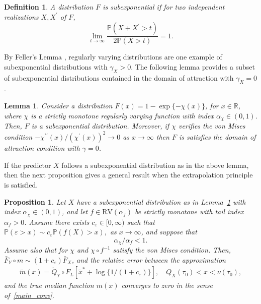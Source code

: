 \documentclass{statsoc}
\newtheorem{proposition}{Proposition}
\newtheorem{lemma}{Lemma}
\newtheorem{definition}{Definition}
\theoremstyle{break}
\renewcommand{\P}{\mathbb P}
\newcommand{\tauzero}{\tau_0}
\begin{document}
\begin{definition}\label{def:subexponential}
A distribution $F$ is subexponential if for two independent realizations $X, X^\prime$ of $F$, 
\[
\lim_{t \to \infty} \frac{\P(X + X^\prime > t)}{2\P(X > t)} = 1.
\]	
\end{definition}
By Feller's Lemma \cite[Lemma 1.3.1]{embrechts:kluppelberg:mikosch:2013}, regularly varying distributions are one example of subexponential distributions with $\gamma_X> 0$. 
 The following lemma provides a subset of subexponential distributions contained in the domain of attraction with $\gamma_X = 0$. 
 
 \begin{lemma}\label{ex:exp:chi:subexponential}
	Consider a distribution $F(x) =1 - \exp\{- \chi(x) \}$, for $x \in \mathbb{R}$, where $\chi$ is a strictly monotone regularly varying function with index $ \alpha_\chi \in (0,1)$.  Then, $F$ is a subexponential distribution. 
	Moreover, if $\chi$ verifies the von Mises condition $-{\chi^{\prime \prime} (x) }/{({\chi^\prime}(x))^2} \to 0$ as $x \to \infty$ then $F$ is satisfies the domain of attraction condition with $\gamma = 0$. 
\end{lemma}

If the predictor $X$ follows a subexponential distribution as in the above lemma, then the next proposition gives a general result when the extrapolation principle is satisfied.


\begin{proposition}\label{example:asymptotic:dependence2}
	Let $X$ have a subexponential distribution as in Lemma~\ref{ex:exp:chi:subexponential} with index $\alpha_\chi  \in (0,1)$, and  
	let $f \in\text{RV}(\alpha_f)$ be strictly monotone with tail index $\alpha_f  > 0$.
	Assume there exists $c_\varepsilon \in [0, \infty)$ such that $\P(\varepsilon > x) \sim c_\varepsilon \P(f(X)>x),$ as $x\to\infty$, and suppose that 
	\[\alpha_\chi / \alpha_f < 1.\]
	Assume also that for $\chi$ and $\chi \circ f^{-1}$ satisfy the von Mises condition.
	 Then, $\bar F_Y \circ m \sim (1+c_\varepsilon)\bar F_X$, and the relative error between the approximation 
	 \begin{align*} 
	 \tilde m(x) =  
	 \tilde Q_Y \circ F_L[\tilde x^* + \log\{1/(1+c_\varepsilon)\}], \quad Q_X(\tauzero) <  x < \nu(\tauzero),
	 \end{align*}
	 and the true median function $m(x)$ converges to zero in the sense of~\eqref{main_conv}.
\end{proposition}
\end{document}
